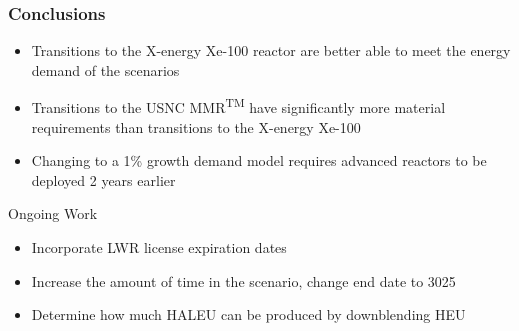 \begin{frame}
    \frametitle{Conclusions}
    \begin{itemize}
        \item Transitions to the X-energy Xe-100 reactor are better able to meet 
              the energy demand of the scenarios
        \item Transitions to the \gls{USNC} \gls{MMR}\textsuperscript{TM}
              have significantly more material requirements than transitions to 
              the X-energy Xe-100
        \item Changing to a 1\% growth demand model requires 
              advanced reactors to be deployed 2 years earlier
    \end{itemize}
    \begin{block}{Ongoing Work}
        \begin{itemize}
            \item Incorporate \gls{LWR} license expiration dates
            \item Increase the amount of time in the scenario, change end date to 3025
            \item Determine how much \gls{HALEU} can be produced by downblending \gls{HEU}
        \end{itemize}
    \end{block}
\end{frame}
